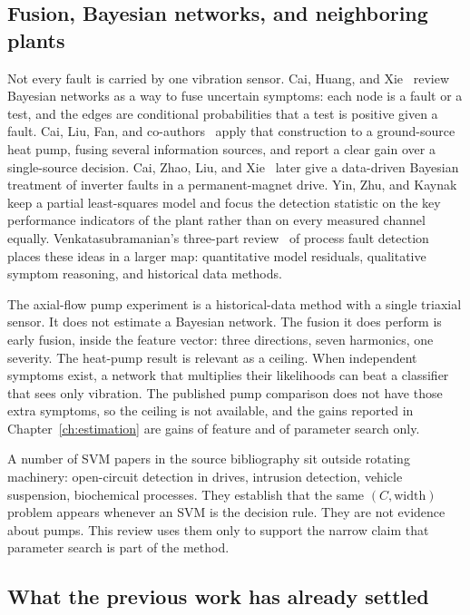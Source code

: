 \subsection{Fusion, Bayesian networks, and neighboring plants}

Not every fault is carried by one vibration sensor.
Cai, Huang, and Xie~\cite{cai2017bn} review Bayesian networks as a way to fuse uncertain symptoms: each node is a fault or a test, and the edges are conditional probabilities that a test is positive given a fault.
Cai, Liu, Fan, and co-authors~\cite{cai2014} apply that construction to a ground-source heat pump, fusing several information sources, and report a clear gain over a single-source decision.
Cai, Zhao, Liu, and Xie~\cite{cai2017inv} later give a data-driven Bayesian treatment of inverter faults in a permanent-magnet drive.
Yin, Zhu, and Kaynak~\cite{yin2015} keep a partial least-squares model and focus the detection statistic on the key performance indicators of the plant rather than on every measured channel equally.
Venkatasubramanian's three-part review~\cite{venkat2003} of process fault detection places these ideas in a larger map: quantitative model residuals, qualitative symptom reasoning, and historical data methods.

The axial-flow pump experiment is a historical-data method with a single triaxial sensor.
It does not estimate a Bayesian network.
The fusion it does perform is early fusion, inside the feature vector: three directions, seven harmonics, one severity.
The heat-pump result is relevant as a ceiling.
When independent symptoms exist, a network that multiplies their likelihoods can beat a classifier that sees only vibration.
The published pump comparison does not have those extra symptoms, so the ceiling is not available, and the gains reported in Chapter~\ref{ch:estimation} are gains of feature and of parameter search only.

A number of SVM papers in the source bibliography sit outside rotating machinery: open-circuit detection in drives, intrusion detection, vehicle suspension, biochemical processes.
They establish that the same \((C, \text{width})\) problem appears whenever an SVM is the decision rule.
They are not evidence about pumps.
This review uses them only to support the narrow claim that parameter search is part of the method.

\subsection{What the previous work has already settled}

